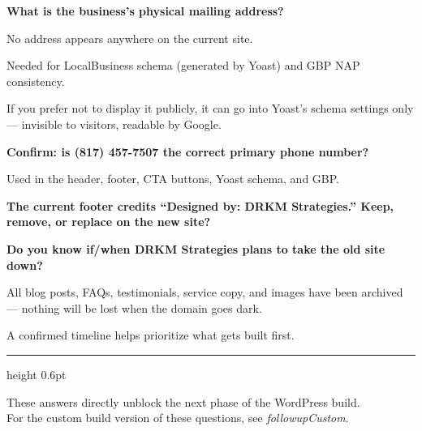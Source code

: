 \documentclass[11pt, letterpaper]{article}
\begin{document}
\begin{checklist}
  \item \textbf{What is the business's physical mailing address?}
    \begin{checklist}
      \item No address appears anywhere on the current site.
      \item Needed for LocalBusiness schema (generated by Yoast) and GBP NAP
            consistency.
      \item If you prefer not to display it publicly, it can go into Yoast's
            schema settings only --- invisible to visitors, readable by Google.
    \end{checklist}

  \item \textbf{Confirm: is (817) 457-7507 the correct primary phone number?}
    \begin{checklist}
      \item Used in the header, footer, CTA buttons, Yoast schema, and GBP.
    \end{checklist}

  \item \textbf{The current footer credits ``Designed by: DRKM Strategies.''
    Keep, remove, or replace on the new site?}

  \item \textbf{Do you know if/when DRKM Strategies plans to take the old
    site down?}
    \begin{checklist}
      \item All blog posts, FAQs, testimonials, service copy, and images have
            been archived --- nothing will be lost when the domain goes dark.
      \item A confirmed timeline helps prioritize what gets built first.
    \end{checklist}
\end{checklist}

\vspace{16pt}
{\color{accent}\hrule height 0.6pt}
\vspace{8pt}

\begin{center}
  \small\color{midgray}
  These answers directly unblock the next phase of the WordPress build.\\
  For the custom build version of these questions, see \emph{followupCustom}.
\end{center}
\end{document}
